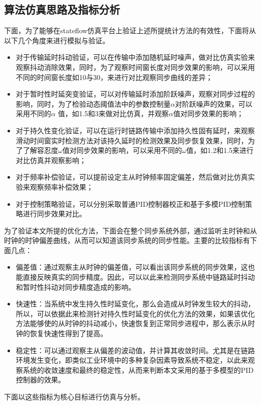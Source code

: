 \subsection{算法仿真思路及指标分析}
下面，为了能够在stateflow仿真平台上验证上述所提统计方法的有效性，下面将从以下几个角度来进行模拟与验证。
\begin{itemize}[noitemsep,topsep=0pt,parsep=0pt,partopsep=0pt]
  \item 对于传输延时抖动验证，可以在传输中添加随机延时噪声，做对比仿真实验来观察抖动消除效果，同时，为了观察时间窗长度对同步效果的影响，可以采用不同的时间窗长度如10与30，来进行对比观察同步曲线的差异；
  \item 对于暂时性时延突变验证，可以对传输延时添加阶跃噪声，观察对同步过程的影响，同时，为了检验动态阈值法中的参数控制量$\alpha$对阶跃噪声的效果，可以采用不同的$\alpha$ 值，如1.5和3来做对比仿真，并观察$\alpha$值对同步效果的影响；
  \item 对于持久性变化验证，可以在运行时链路传输中添加持久性固有延时，来观察滑动时间窗实时检测方法对该持久延时的检测效果及同步恢复效果，同时，为了了解容忍度$\omega$值对同步效果的影响，可以采用不同的$\omega$值，如1.2和1.5来进行对比仿真并观察影响；
  \item 对于频率补偿验证，可以提前设定主从时钟频率固定偏差，然后做对比仿真实验来观察频率补偿效果；
  \item 对于控制策略验证，可以分别采取普通PID控制器校正和基于多模PID控制策略进行同步效果对比。
\end{itemize}
为了验证本文所提的优化方法，下面会在整个同步系统外部，通过监听主时钟和从时钟的时钟偏差曲线，从而可以知道该同步系统的同步性能。主要的比较指标有下面几点：
\begin{itemize}[noitemsep,topsep=0pt,parsep=0pt,partopsep=0pt]
  \item 偏差值：通过观察主从时钟的偏差值，可以看出该同步系统的同步效果，这也能直接反映真实的同步精度。因此，可以以此来检测同步系统中链路延时抖动和暂时性抖动对同步精度造成的影响。
  \item 快速性：当系统中发生持久性时延变化，那么会造成从时钟发生较大的抖动，所以，可以依据此来检测针对持久性时延变化的优化方法的效果，如果该优化方法能够使的从时钟的抖动减小，快速恢复到正常同步进程中，那么表示从时钟的恢复快速性得到了提高。
  \item 稳定性：可以通过观察主从偏差的波动值，并计算其收敛时间。尤其是在链路环境发生变化，即类似工业环境中的多种复杂因素导致系统不稳定，以此来观察系统的收敛速度和最终的稳定性，从而来判断本文采用的基于多模型的PID控制器的效果。
\end{itemize}
下面以这些指标为核心目标进行仿真与分析。
\\ \\ \\ \\

